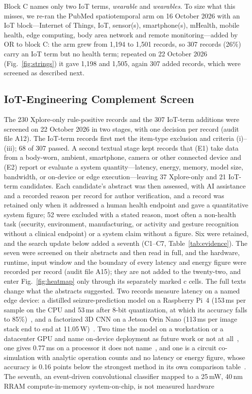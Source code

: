\documentclass[journal]{IEEEtran}
\begin{document}
Block C names only two IoT terms, \emph{wearable} and \emph{wearables}. To size what this misses, we re-ran the PubMed spatiotemporal arm on 16 October 2026 with an IoT block---Internet of Things, IoT, sensor(s), smartphone(s), mHealth, mobile health, edge computing, body area network and remote monitoring---added by OR to block C: the arm grew from 1{,}194 to 1{,}501 records, so 307 records (26\%) carry an IoT term but no health term; repeated on 22 October 2026 (Fig.~\ref{fig:strings}) it gave 1{,}198 and 1{,}505, again 307 added records, which were screened as described next.

\subsection{IoT-Engineering Complement Screen}
\label{sec:iotcomplement}
The 230 Xplore-only rule-positive records and the 307 IoT-term additions were screened on 22 October 2026 in two stages, with one decision per record (audit file A12). The IoT-term records first met the item-type exclusion and criteria (i)--(iii); 68 of 307 passed. A second textual stage kept records that (E1) take data from a body-worn, ambient, smartphone, camera or other connected device and (E2) report or evaluate a system quantity---latency, energy, memory, model size, bandwidth, or on-device or edge execution---leaving 37 Xplore-only and 21 IoT-term candidates. Each candidate's abstract was then assessed, with AI assistance and a recorded reason per record for author verification, and a record was retained only when it addressed a human health endpoint and gave a quantitative system figure; 52 were excluded with a stated reason, most often a non-health task (security, environment, manufacturing, or activity and gesture recognition without a clinical endpoint) or a system claim without a figure. Six were retained, and the search update below added a seventh (C1--C7, Table~\ref{tab:evidence}). The seven were screened on their abstracts and then read in full, and the hardware, runtime, input window and the boundary of every latency and energy figure were recorded per record (audit file A15); they are not added to the twenty-two, and enter Fig.~\ref{fig:heatmap} only through its separately marked c cells. The full texts change what the abstracts suggested. Two records measure latency on a named edge device: a distilled seizure-prediction model on a Raspberry Pi~4 (153\,ms per sample on the CPU and 53\,ms after 8-bit quantization, at which its accuracy falls to 85\%)~\cite{trabelsi2025kdepilepsy}, and a factorized 3D CNN on a Jetson Orin Nano (113\,ms per image stack end to end at 11.05\,W)~\cite{wang2026timesight}. Two time the model on a workstation or a datacenter GPU and name on-device deployment as future work or not at all~\cite{bhatti2025falls,kim2026cgmeeg}, one gives 0.77\,ms on a processor it does not name~\cite{huynh2026afdetect}, and one is a circuit co-simulation with analytic operation counts and no latency or energy figure, whose accuracy is 0.16 points below the strongest method in its own comparison table~\cite{chu2021neuromorphicecg}. The seventh, an event-driven convolutional classifier mapped to a 25\,mW, 40\,nm RRAM compute-in-memory system-on-chip, is not measured hardware 
\end{document}
